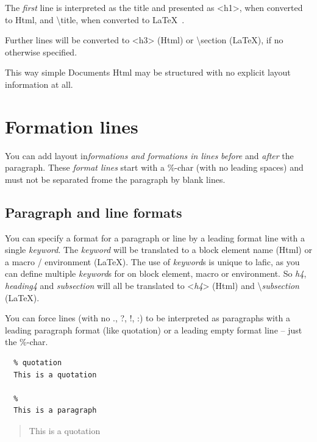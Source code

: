 \documentclass{article}
\begin{document}
{The \emph{first} line is interpreted as the title and presented as
 <h1>, when converted to Html, and \textbackslash title, when converted to
 \LaTeX\ .\\}

{Further lines will be converted to <h3> (Html) or \textbackslash section
(LaTeX), if no otherwise specified.\\}

{This way simple Documents Html may be structured with no explicit
layout information at all.\\}

\section{Formation lines}
\label{}

{You can add layout in\emph{formations and formations in lines}
\emph{before} and \emph{after} the paragraph. These \emph{format lines} start
with a \%-char (with no leading spaces) and must not be
separated frome the paragraph by blank lines.\\}

\subsection{Paragraph and line formats}
\label{}

{You can specify a format for a paragraph or line by a
leading format line with a single \emph{keyword}. The \emph{keyword} will
be translated to a block element name (Html) or a macro /
environment (LaTeX). The use of \emph{keyword}s is unique to lafic,
as you can define multiple \emph{keyword}s for on block element,
macro or environment. So \emph{h4}, \emph{heading4} and \emph{subsection} will all be
translated to <\emph{h4}> (Html) and \textbackslash \emph{subsection} (LaTeX).\\}

{You can force lines (with no ., ?, !, :) to be interpreted
as paragraphs with a leading paragraph format (like
quotation) or a leading empty format line – just the \%-char.\\}

\begin{verbatim}
  % quotation
  This is a quotation

  %
  This is a paragraph
\end{verbatim}


\colorbox{gray!75}{\parbox{\linewidth}{%
\begin{quotation}
This is a quotation
\end{quotation}

}
}
\end{document}
